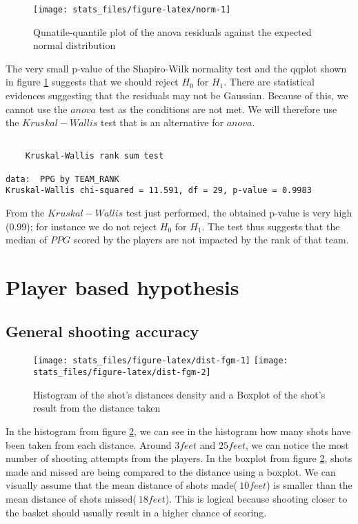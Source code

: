 \documentclass[
  12pt,
]{article}
\begin{document}
\begin{figure}
\texttt{[image: stats\_files/figure-latex/norm-1]} \caption{Qunatile-quantile plot of the anova residuals against the expected normal distribution}\label{fig:norm}
\end{figure}
\newpage

The very small p-value of the Shapiro-Wilk normality test and the qqplot shown in figure \ref{fig:norm} suggests that we should reject \(H_{0}\) for \(H_{1}\). There are statistical evidences suggesting that the residuals may not be Gaussian. Because of this, we cannot use the \(anova\) test as the conditions are not met. We will therefore use the \(Kruskal-Wallis\) test that is an alternative for \(anova\).

\begin{verbatim}

    Kruskal-Wallis rank sum test

data:  PPG by TEAM_RANK
Kruskal-Wallis chi-squared = 11.591, df = 29, p-value = 0.9983
\end{verbatim}

From the \(Kruskal-Wallis\) test just performed, the obtained p-value is very high (\(0.99\)); for instance we do not reject \(H_{0}\) for \(H_{1}\). The test thus suggests that the median of \(PPG\) scored by the players are not impacted by the rank of that team.

\hypertarget{sec:PlayerBased}{%
\section{Player based hypothesis}\label{sec:PlayerBased}}

\hypertarget{sec:Shot-Dist}{%
\subsection{General shooting accuracy}\label{sec:Shot-Dist}}

\begin{figure}
\texttt{[image: stats\_files/figure-latex/dist-fgm-1]} \texttt{[image: stats\_files/figure-latex/dist-fgm-2]} \caption{Histogram of the shot's distances density and a Boxplot of the shot's result from the distance taken}\label{fig:dist-fgm}
\end{figure}

In the histogram from figure \ref{fig:dist-fgm}, we can see in the histogram how many shots have been taken from each distance. Around \(3 feet\) and \(25 feet\), we can notice the most number of shooting attempts from the players.
In the boxplot from figure \ref{fig:dist-fgm}, shots made and missed are being compared to the distance using a boxplot. We can visually assume that the mean distance of shots made(\(~10 feet\)) is smaller than the mean distance of shots missed(\(~18 feet\)). This is logical because shooting closer to the basket should usually result in a higher chance of scoring.
\end{document}
